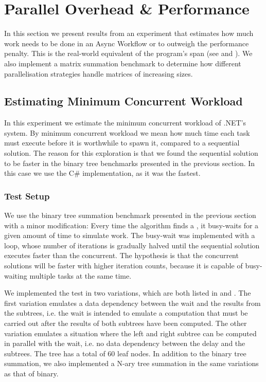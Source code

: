\section{Parallel Overhead \& Performance}\label{sec:crit:work}
In this section we present results from an experiment that estimates how much work needs to be done in an Async Workflow or  to outweigh the performance penalty. This is the real-world equivalent of the program's span (see  and ). We also implement a matrix summation benchmark to determine how different parallelisation strategies handle matrices of increasing sizes.

\subsection{Estimating Minimum Concurrent Workload}
In this experiment we estimate the minimum concurrent workload of .NET's  system. By minimum concurrent workload we mean how much time each task must execute before it is worthwhile to spawn it, compared to a sequential solution. The reason for this exploration is that we found the sequential solution to be faster in the binary tree benchmarks presented in the previous section. In this case we use the C\# implementation, as it was the fastest.

\subsubsection{Test Setup}\label{sec:crit-work-setup}
We use the binary tree summation benchmark presented in the previous section with a minor modification: Every time the algorithm finds a , it busy-waits for a given amount of time to simulate work. The busy-wait was implemented with a loop, whose number of iterations is gradually halved until the sequential solution executes faster than the concurrent. The hypothesis is that the concurrent solutions will be faster with higher iteration counts, because it is capable of busy-waiting multiple tasks at the same time.

We implemented the test in two variations, which are both listed in  and . The first variation emulates a data dependency between the wait and the results from the subtrees, i.e. the wait is intended to emulate a computation that must be carried out after the results of both subtrees have been computed. The other variation emulates a situation where the left and right subtree can be computed in parallel with the wait, i.e. no data dependency between the delay and the subtrees. The tree has a total of 60 leaf nodes. In addition to the binary tree summation, we also implemented a N-ary tree summation in the same variations as that of binary.


